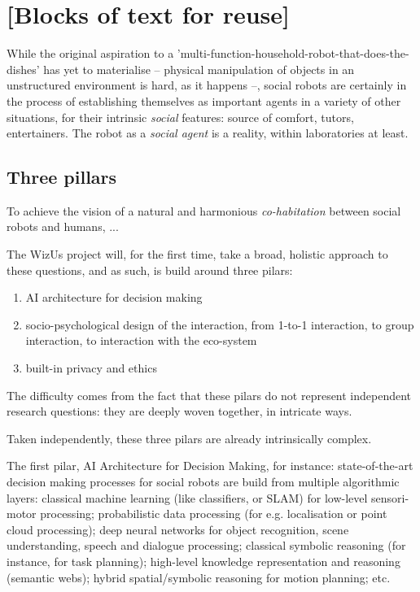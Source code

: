\documentclass[11pt]{report}
\newcommand{\project}{WizUs\xspace}
\begin{document}
\section{[Blocks of text for reuse]}

While the original aspiration to a
'multi-function-household-robot-that-does-the-dishes' has yet to materialise --
physical manipulation of objects in an unstructured environment is hard, as it
happens --, social robots are certainly in the process of establishing
themselves as important agents in a variety of other situations, for their
intrinsic \emph{social} features: source of comfort, tutors, entertainers. The
robot as a \emph{social agent} is a reality, within laboratories at least.


\subsection{Three pillars}

To achieve the vision of a natural and harmonious \emph{co-habitation} between
social robots and humans, ...

The \project project will, for the first time, take a broad, holistic approach
to these questions, and as such, is build around three pilars:

\begin{enumerate}
    \item AI architecture for decision making
    \item socio-psychological design of the interaction, from 1-to-1
        interaction, to group interaction, to interaction with the eco-system
    \item built-in privacy and ethics
\end{enumerate}

The difficulty comes from the fact that these pilars do not represent independent
research questions: they are deeply woven together, in intricate ways.


Taken independently, these three pilars are already intrinsically complex.

The first pilar, AI Architecture for Decision Making, for instance:
state-of-the-art decision making processes for social robots are build from
multiple algorithmic layers: classical machine learning (like classifiers, or
SLAM) for low-level sensori-motor processing; probabilistic data processing (for
e.g. localisation or point cloud processing); deep neural networks for object
recognition, scene understanding, speech and dialogue processing; classical
symbolic reasoning (for instance, for task planning); high-level knowledge
representation and reasoning (semantic webs); hybrid spatial/symbolic reasoning
for motion planning; etc.
\end{document}
